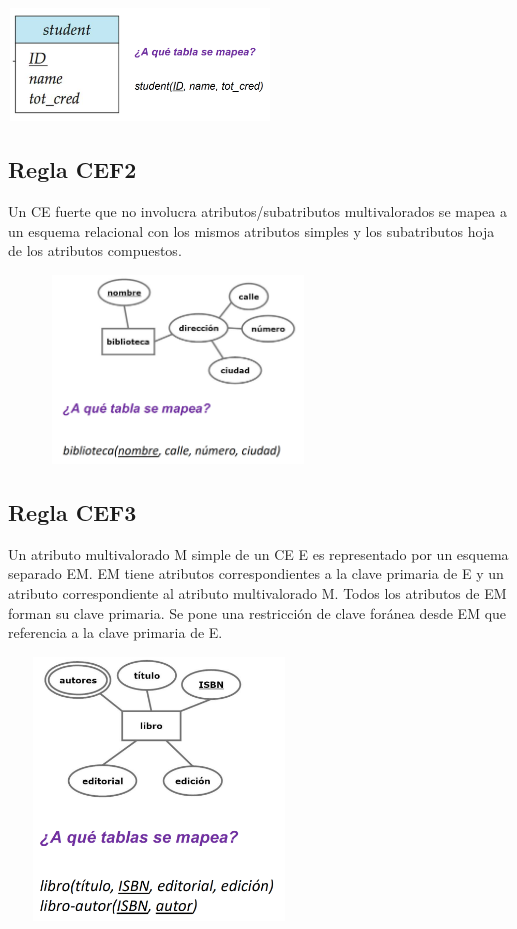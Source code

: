 \documentclass[12pt,a4paper]{report}
\begin{document}
			\begin{center}
				\includegraphics[width=7cm, height=3cm]{./imagenes/cef1.png}
			\end{center}
		
		\subsection{Regla CEF2}
			\par Un CE fuerte que no involucra atributos/subatributos multivalorados se mapea a un esquema relacional con los mismos atributos simples y los subatributos hoja de los atributos compuestos.
		
			\begin{center}
				\includegraphics[width=9cm, height=5cm]{./imagenes/cef2.png}
			\end{center}
		
		\subsection{Regla CEF3}
			\par Un atributo multivalorado M simple de un CE E es representado por un esquema separado EM. EM tiene atributos correspondientes a la clave primaria de E y un atributo correspondiente al atributo multivalorado M. Todos los atributos de EM forman su clave primaria. Se pone una restricción de clave foránea desde EM que referencia a la clave primaria de E.
			
			\begin{center}
				\includegraphics[width=8cm, height=7cm]{./imagenes/cef3.png}
			\end{center}
			
\end{document}
